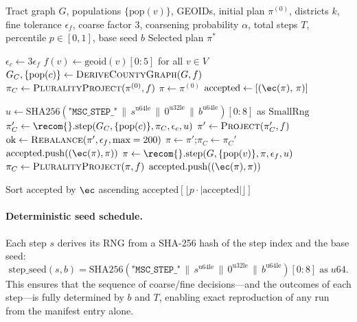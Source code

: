 \begin{algorithm}
\caption{\ms{} Option B}
\label{alg:multiscale}
\begin{algorithmic}[1]
\Require Tract graph $G$, populations $\{\mathrm{pop}(v)\}$, GEOIDs,
         initial plan $\pi^{(0)}$, districts $k$,
         fine tolerance $\epsilon_f$, coarse factor 3,
         coarsening probability $\alpha$, total steps $T$,
         percentile $p \in [0,1]$, base seed $b$
\Ensure  Selected plan $\pi^*$

\State $\epsilon_c \gets 3 \epsilon_f$
\State $f(v) \gets \mathrm{geoid}(v)[0{:}5]$ for all $v \in V$
\State $G_C, \{\mathrm{pop}(c)\} \gets \textsc{DeriveCountyGraph}(G, f)$
\State $\pi_C \gets \textsc{PluralityProject}(\pi^{(0)}, f)$
\State $\pi \gets \pi^{(0)}$
\State $\mathrm{accepted} \gets [(\ec(\pi),\, \pi)]$

  \State $u \gets \mathrm{SHA256}(\texttt{"MSC\_STEP\_"} \,\|\, s^{\mathrm{u64le}}
         \,\|\, 0^{\mathrm{u32le}} \,\|\, b^{\mathrm{u64le}})[0{:}8]$
         as $\mathrm{SmallRng}$
    \State $\pi_C' \gets \recom{}.\mathrm{step}(G_C, \{\mathrm{pop}(c)\}, \pi_C, \epsilon_c, u)$
    \State $\pi' \gets \textsc{Project}(\pi_C', f)$
    \State $\mathrm{ok} \gets \textsc{Rebalance}(\pi', \epsilon_f, \text{max}=200)$
      \State $\pi \gets \pi'$;\quad $\pi_C \gets \pi_C'$
      \State $\mathrm{accepted}.\mathrm{push}((\ec(\pi), \pi))$
    \EndIf
  \Else
    \State $\pi \gets \recom{}.\mathrm{step}(G, \{\mathrm{pop}(v)\}, \pi, \epsilon_f, u)$
    \State $\pi_C \gets \textsc{PluralityProject}(\pi, f)$
    \State $\mathrm{accepted}.\mathrm{push}((\ec(\pi), \pi))$
  \EndIf
\EndFor

\State Sort $\mathrm{accepted}$ by $\ec$ ascending
\State \Return $\mathrm{accepted}[\lfloor p \cdot |\mathrm{accepted}|\rfloor]$
\end{algorithmic}
\end{algorithm}

\paragraph{Deterministic seed schedule.}
Each step $s$ derives its RNG from a SHA-256 hash of the step index and
the base seed:
\[
  \mathrm{step\_seed}(s, b)
  = \mathrm{SHA256}\!\left(\texttt{"MSC\_STEP\_"}
    \,\|\, s^{\mathrm{u64le}}
    \,\|\, 0^{\mathrm{u32le}}
    \,\|\, b^{\mathrm{u64le}}\right)[0{:}8]
    \;\text{as}\; u64.
\]
This ensures that the sequence of coarse/fine decisions---and the outcomes
of each step---is fully determined by $b$ and $T$, enabling exact
reproduction of any run from the manifest entry alone.

